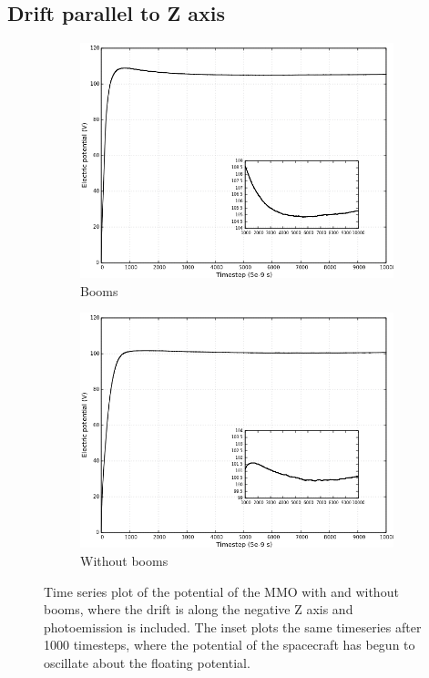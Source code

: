\subsection*{Drift parallel to Z axis}

\begin{figure}[H]
  \centering
  \begin{subfigure}[b]{0.75\textwidth}
  \includegraphics[width=\columnwidth]{figures/MMO/minZ/WB/C_minZ_WB.png}
  \caption{Booms}
  \label{fig:C_minZ_WB}
\end{subfigure}
\par\bigskip
\begin{subfigure}[b]{0.75\textwidth}
  \includegraphics[width=\columnwidth]{figures/MMO/minZ/NB/C_minZ_NB.png}
  \caption{Without booms}
  \label{fig:C_minZ_NB}
\end{subfigure}
\label{fig:Conv_minZ}
\caption{Time series plot of the potential of the MMO with and without booms, where the drift is along the negative Z axis and photoemission is included. The inset plots the same timeseries after 1000 timesteps, where the potential of the spacecraft has begun to oscillate about the floating potential.}
\end{figure}


